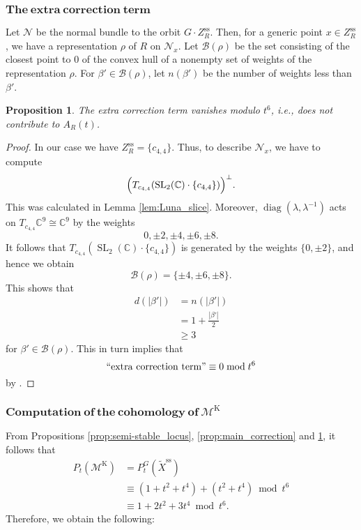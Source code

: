 \documentclass[12pt, pdftex]{amsart}
\theoremstyle{plain}
\newtheorem{prop}[thm]{Proposition}
\theoremstyle{definition}
\numberwithin{equation}{section}
\def\C{{\mathbb C}}
\def\SL{\mathop{\mathrm{SL}}\nolimits}
\def\diag{\mathop{\mathrm{diag}}\nolimits}
\def\ss{\mathop{\mathrm{ss}}}
\def\K{\mathrm{K}}
\def\M{\mathcal{M}}
\begin{document}
\subsubsection{$\mathrm{\mathbf{The\ extra\ correction\ term}}$}
\label{subsection:extra_correction}

Let $\mathcal{N}$ be the normal bundle to the orbit $G\cdot Z_R^{\ss}$.
Then, for a generic point $x\in Z_R^{\ss}$, we have a representation $\rho$ of $R$ on $\mathcal{N}_x$.
Let $\mathcal{B}(\rho)$ be the set consisting of the closest point to 0 of the convex hull of a nonempty set of weights of the representation $\rho$.
For $\beta'\in\mathcal{B}(\rho)$, let $n(\beta')$ be the number of weights less than $\beta'$.

\begin{prop}
\label{prop:extra_correction}
The extra correction term vanishes modulo $t^6$, i.e.,  does not contribute to $A_R(t)$.
\end{prop}
\begin{proof}
In our case we have $Z_R^{\ss}=\{c_{4,4}\}$.
Thus, to describe $\mathcal{N}_x$, we have to compute  \[\Bigl(T_{c_{4,4}}(\SL_2(\C)\cdot\{c_{4,4}\})\Bigr)^{\perp}.\]
This was calculated in Lemma \ref{lem:Luna_slice}.
Moreover, $\diag(\lambda, \lambda^{-1})$ acts on $T_{c_{4,4}}\C^9\cong\C^9$ by the weights 
\[0, \pm 2, \pm 4, \pm 6, \pm 8.\]
It follows that $T_{c_{4,4}}(\SL_2(\C)\cdot\{c_{4,4}\})$ is generated by the weights $\{0, \pm 2\}$, and hence we obtain
\[\mathcal{B}(\rho)=\{\pm 4, \pm 6, \pm 8\}.\]
This shows that 
\begin{align*}
    d(|\beta'|)&=n(|\beta'|)\\
    &=1+\frac{|\beta'|}{2}\\
    &\geq 3
\end{align*}
for $\beta'\in\mathcal{B}(\rho)$.
This in turn implies that 
\[\mathrm{``extra\ correction\ term"} \equiv 0 \bmod t^6\]
by \cite[(4.25)]{CMGHL19}.
\end{proof}

\subsubsection{$\mathrm{\mathbf{Computation\ of\ the\ cohomology\ of\  \M^{\K}}}$}
From Propositions \ref{prop:semi-stable_locus}, \ref{prop:main_correction} and \ref{prop:extra_correction}, it follows that
\begin{align*}
    P_t(\M^{\K})&= P_t^G(\widetilde{X}^{\ss})\\
    &\equiv (1+t^2+t^4)+(t^2+t^4) \bmod t^6\\
    &\equiv 1+2t^2+3t^4 \bmod t^6.
\end{align*}
Therefore, we obtain the following:
\end{document}
